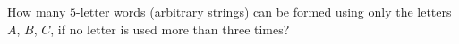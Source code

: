 How many $5$-letter words (arbitrary strings) can be formed using only the letters $A$, $B$, $C$, if no letter is used more than three times?
